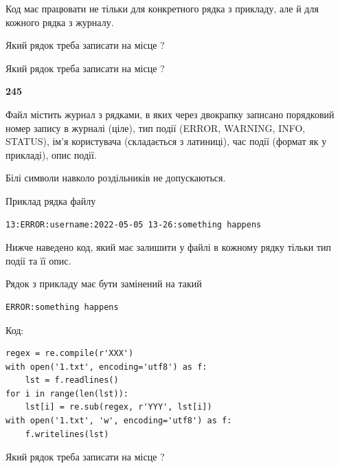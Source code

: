Код має працювати не тільки для конкретного рядка з прикладу, але й для кожного рядка з журналу.




Який рядок треба записати на місце  ?\par
\vspace{5mm}


Який рядок треба записати на місце  ?\par


\newpage

{\begin {center}\textbf{ 245}\end {center}}\par
Файл  містить журнал з рядками, в яких через двокрапку записано поряд\-ко\-вий номер запису в журналі (ціле), тип події (ERROR, WARNING, INFO, STATUS), ім'я користувача (складається з латиниці), час події (фор\-мат як у прикладі), опис події.

Білі символи навколо роздільників не допускаються.

Приклад рядка файлу



\begin{verbatim}
13:ERROR:username:2022-05-05 13-26:something happens
\end{verbatim}


Нижче наведено код, який має залишити у файлі в кожному рядку тільки тип події та її опис.

Рядок з прикладу має бути замінений на такий



\begin{verbatim}
ERROR:something happens
\end{verbatim}




Код:



\begin{verbatim}
regex = re.compile(r'XXX')
with open('1.txt', encoding='utf8') as f:
    lst = f.readlines()
for i in range(len(lst)):
    lst[i] = re.sub(regex, r'YYY', lst[i])
with open('1.txt', 'w', encoding='utf8') as f:
    f.writelines(lst)
\end{verbatim}









Який рядок треба записати на місце  ?\par
\vspace{5mm}


